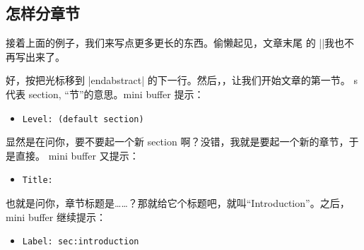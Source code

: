 \subsection{怎样分章节}

接着上面的例子，我们来写点更多更长的东西。偷懒起见，文章末尾
的 \ltx||我也不再写出来了。

好，按把光标移到 \ltx|end{abstract}| 的下一行。然后，，让我们开始文章的第一节。
s 代表 section, “节”的意思。mini buffer 提示：

\begin{itemize}
\item[] \texttt{Level: (default section) }
\end{itemize}

显然是在问你，要不要起一个新 section 啊？没错，我就是要起一个新的章节，于是直接。
mini buffer 又提示：

\begin{itemize}
\item[] \texttt{Title:}
\end{itemize}

也就是问你，章节标题是……？那就给它个标题吧，就叫“Introduction”。之后， mini buffer 继续提示：

\begin{itemize}
\item[] \texttt{Label: sec:introduction}
\end{itemize}


